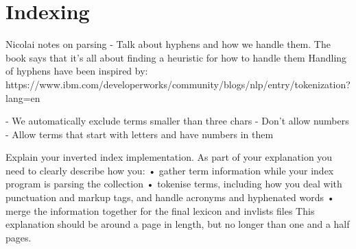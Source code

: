 
\section{Indexing}
\label{sec:indexing}

Nicolai notes on parsing
- Talk about hyphens and how we handle them. The book says that it's all about finding a heuristic for how to handle them
Handling of hyphens have been inspired by: https://www.ibm.com/developerworks/community/blogs/nlp/entry/tokenization?lang=en

- We automatically exclude terms smaller than three chars
- Don't allow numbers
- Allow terms that start with letters and have numbers in them


Explain your inverted index implementation. As part of your explanation you need to clearly describe how you:
• gather term information while your index program is parsing the collection
• tokenise terms, including how you deal with punctuation and markup tags, and
handle acronyms and hyphenated words
• merge the information together for the final lexicon and invlists files
This explanation should be around a page in length, but no longer than one and a half pages.


